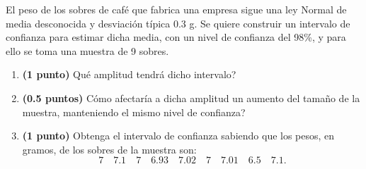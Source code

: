 
El peso de los sobres de café que fabrica una empresa sigue una ley Normal de media desconocida y desviación típica 0.3 g. Se quiere construir un intervalo de confianza para estimar dicha media, con un nivel de confianza del 98\%, y para ello se toma una muestra de 9 sobres.
\begin{enumerate}[label=\alph*)]
\item \textbf{(1 punto)} \textquestiondown{}Qué amplitud tendrá dicho intervalo?
\item \textbf{(0.5 puntos)} \textquestiondown{}Cómo afectaría a dicha amplitud un aumento del tamaño de la muestra, manteniendo el mismo nivel de confianza?
\item \textbf{(1 punto)} Obtenga el intervalo de confianza sabiendo que los pesos, en gramos, de los sobres de la muestra son:
\[
7\quad7.1\quad7\quad6.93\quad7.02\quad7\quad7.01\quad6.5\quad7.1.
\]
\end{enumerate}
